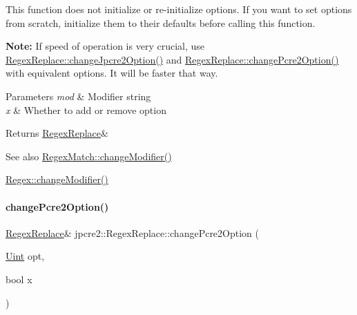 This function does not initialize or re-\/initialize options. If you want to set options from scratch, initialize them to their defaults before calling this function.

{\bfseries Note\+:} If speed of operation is very crucial, use \hyperlink{classjpcre2_1_1RegexReplace_afebf5e76bce8e312ab6dbdec3288b02b_afebf5e76bce8e312ab6dbdec3288b02b}{Regex\+Replace\+::change\+Jpcre2\+Option()} and \hyperlink{classjpcre2_1_1RegexReplace_aea15c694bba7d994f048596a1f90f71f_aea15c694bba7d994f048596a1f90f71f}{Regex\+Replace\+::change\+Pcre2\+Option()} with equivalent options. It will be faster that way. 
\begin{DoxyParams}{Parameters}
{\em mod} & Modifier string \\
\hline
{\em x} & Whether to add or remove option \\
\hline
\end{DoxyParams}
\begin{DoxyReturn}{Returns}
\hyperlink{classjpcre2_1_1RegexReplace}{Regex\+Replace}\& 
\end{DoxyReturn}
\begin{DoxySeeAlso}{See also}
\hyperlink{classjpcre2_1_1RegexMatch_a877be3123d789020d259939bc79e8cfe_a877be3123d789020d259939bc79e8cfe}{Regex\+Match\+::change\+Modifier()} 

\hyperlink{classjpcre2_1_1Regex_a9ab3efed9819a51225456e6d8487de56_a9ab3efed9819a51225456e6d8487de56}{Regex\+::change\+Modifier()} 
\end{DoxySeeAlso}
\hypertarget{classjpcre2_1_1RegexReplace_aea15c694bba7d994f048596a1f90f71f_aea15c694bba7d994f048596a1f90f71f}{}\label{classjpcre2_1_1RegexReplace_aea15c694bba7d994f048596a1f90f71f_aea15c694bba7d994f048596a1f90f71f} 
\paragraph{\texorpdfstring{change\+Pcre2\+Option()}{changePcre2Option()}}
{\footnotesize\ttfamily \hyperlink{classjpcre2_1_1RegexReplace}{Regex\+Replace}\& jpcre2\+::\+Regex\+Replace\+::change\+Pcre2\+Option (\begin{DoxyParamCaption}\item[{\hyperlink{namespacejpcre2_a078242d38221a13fb3543b9edd78c099}{Uint}}]{opt,  }\item[{bool}]{x }\end{DoxyParamCaption})\hspace{0.3cm}{\ttfamily [inline]}}



